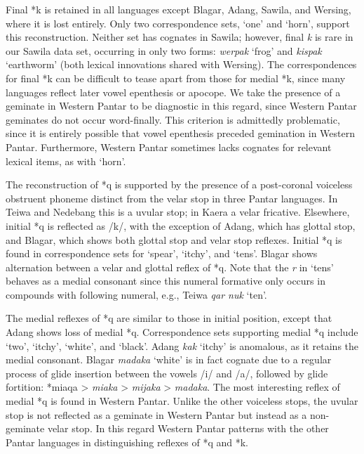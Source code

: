 Final *k is retained in all languages except Blagar, Adang, Sawila, and Wersing, where it is lost entirely. Only two correspondence sets, `one' and `horn', support this reconstruction. Neither set has cognates in Sawila; however, final \textit{k }is rare in our Sawila data set, occurring in only two forms: \textit{werpa{\textlengthmark}k }`frog' and \textit{kispa{\textlengthmark}k }`earthworm' (both lexical innovations shared with Wersing). The correspondences for final *k can be difficult to tease apart from those for medial *k, since many languages reflect later vowel epenthesis or apocope. We take the presence of a geminate in Western Pantar to be diagnostic in this regard, since Western Pantar geminates do not occur word-finally. This criterion is admittedly problematic, since it is entirely possible that vowel epenthesis preceded gemination in Western Pantar. Furthermore, Western Pantar sometimes lacks cognates for relevant lexical items, as with `horn'. 

The reconstruction of *q is supported by the presence of a post-coronal voiceless obstruent phoneme distinct from the velar stop in three Pantar languages. In Teiwa and Nedebang this is a uvular stop; in Kaera a velar fricative. Elsewhere, initial *q is reflected as /k/, with the exception of Adang, which has glottal stop, and Blagar, which shows both glottal stop and velar stop reflexes. Initial *q is found in correspondence sets for `spear', `itchy', and `tens'. Blagar shows alternation between a velar and glottal reflex of *q. Note that the \textit{r} in `tens' behaves as a medial consonant since this numeral formative only occurs in compounds with following numeral, e.g., Teiwa \textit{qar nuk} `ten'. 

The medial reflexes of *q are similar to those in initial position, except that Adang shows loss of medial *q. Correspondence sets supporting medial *q include `two', `itchy', `white', and `black'. Adang \textit{kak }`itchy' is anomalous, as it retains the medial consonant. Blagar \textit{mad}\textit{{\textyogh}}\textit{aka} `white' is in fact cognate due to a regular process of glide insertion between the vowels /i/ and /a/, followed by glide fortition: *miaqa {\textgreater} \textit{miaka} {\textgreater} \textit{mijaka} {\textgreater}  \textit{mad}\textit{{\textyogh}}\textit{aka}. The most interesting reflex of medial *q is found in Western Pantar. Unlike the other voiceless stops, the uvular stop is not reflected as a geminate in Western Pantar but instead as a non-geminate velar stop. In this regard Western Pantar patterns with the other Pantar languages in distinguishing reflexes of *q and *k.   

